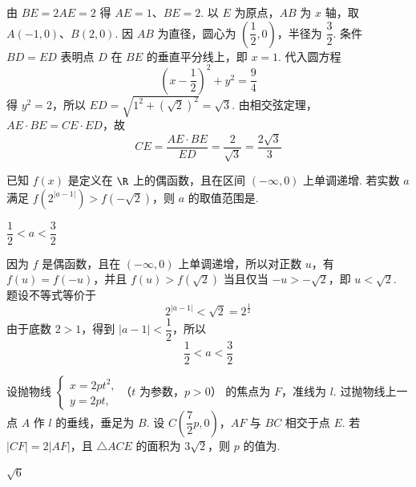 \begin{solution}
由 \(BE=2AE=2\) 得 \(AE=1\)、\(BE=2\). 以 \(E\) 为原点，\(AB\) 为 \(x\) 轴，取 \(A(-1,0)\)、\(B(2,0)\). 因 \(AB\) 为直径，圆心为 \(\left(\dfrac12,0\right)\)，半径为 \(\dfrac32\). 条件 \(BD=ED\) 表明点 \(D\) 在 \(BE\) 的垂直平分线上，即 \(x=1\). 代入圆方程
\[\left(x-\dfrac12\right)^2+y^2=\dfrac94\]
得 \(y^2=2\)，所以 \(ED=\sqrt{1^2+\left(\sqrt2\right)^2}=\sqrt3\). 由相交弦定理，\(AE\cdot BE=CE\cdot ED\)，故
\[CE=\dfrac{AE\cdot BE}{ED}=\dfrac2{\sqrt3}=\dfrac{2\sqrt3}{3}\]
\end{solution}

\begin{problem}
已知 \(f(x)\) 是定义在 \(\R\) 上的偶函数，且在区间 \((-\infty,0)\) 上单调递增. 若实数 \(a\) 满足 \(f\left(2^{\lvert a-1\rvert}\right)>f\left(-\sqrt2\right)\)，则 \(a\) 的取值范围是\fillinblank{}.
\end{problem}

\begin{answer}
\(\dfrac12<a<\dfrac32\)
\end{answer}

\begin{solution}
因为 \(f\) 是偶函数，且在 \((-\infty,0)\) 上单调递增，所以对正数 \(u\)，有
\(f(u)=f(-u)\)，并且 \(f(u)>f(\sqrt2)\) 当且仅当 \(-u>-\sqrt2\)，即 \(u<\sqrt2\). 题设不等式等价于
\[2^{\lvert a-1\rvert}<\sqrt2=2^{\frac{1}{2}}\]
由于底数 \(2>1\)，得到 \(\lvert a-1\rvert<\dfrac12\)，所以
\[\dfrac12<a<\dfrac32\]
\end{solution}

\begin{problem}
设抛物线
\(\begin{cases}
x=2pt^2,\\
y=2pt,
\end{cases}\)（\(t\) 为参数，\(p>0\)）
的焦点为 \(F\)，准线为 \(l\). 过抛物线上一点 \(A\) 作 \(l\) 的垂线，垂足为 \(B\). 设 \(C\left(\dfrac72p,0\right)\)，\(AF\) 与 \(BC\) 相交于点 \(E\). 若 \(\lvert CF\rvert=2\lvert AF\rvert\)，且 \(\triangle ACE\) 的面积为 \(3\sqrt2\)，则 \(p\) 的值为\fillinblank{}.
\end{problem}

\begin{answer}
\(\sqrt{6}\)
\end{answer}

